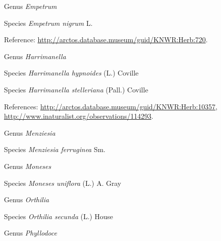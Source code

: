 \documentclass[9pt, article]{memoir}
\begin{document}
\begin{multicols}{2}
\vspace{6pt}\noindent\hspace{30pt}Genus \textit{Empetrum}


\vspace{6pt}\noindent\hspace{36pt}Species \textit{Empetrum nigrum} L.


\vspace{6pt}Reference: 
\url{http://arctos.database.museum/guid/KNWR:Herb:720}.

\vspace{6pt}\noindent\hspace{30pt}Genus \textit{Harrimanella}


\vspace{6pt}\noindent\hspace{36pt}Species \textit{Harrimanella hypnoides} (L.) Coville


\vspace{6pt}\noindent\hspace{36pt}Species \textit{Harrimanella stelleriana} (Pall.) Coville


\vspace{6pt}References: 
\url{http://arctos.database.museum/guid/KNWR:Herb:10357}, 
\url{http://www.inaturalist.org/observations/114293}.

\vspace{6pt}\noindent\hspace{30pt}Genus \textit{Menziesia}


\vspace{6pt}\noindent\hspace{36pt}Species \textit{Menziesia ferruginea} Sm.


\vspace{6pt}\noindent\hspace{30pt}Genus \textit{Moneses}


\vspace{6pt}\noindent\hspace{36pt}Species \textit{Moneses uniflora} (L.) A. Gray


\vspace{6pt}\noindent\hspace{30pt}Genus \textit{Orthilia}


\vspace{6pt}\noindent\hspace{36pt}Species \textit{Orthilia secunda} (L.) House


\vspace{6pt}\noindent\hspace{30pt}Genus \textit{Phyllodoce}



\end{multicols}
\end{document}
